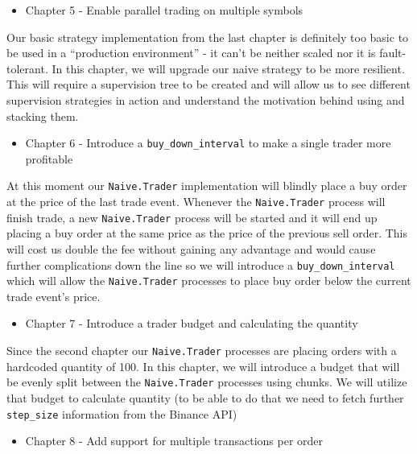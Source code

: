 \documentclass[
]{book}
\providecommand{\tightlist}{%
  \setlength{\itemsep}{0pt}\setlength{\parskip}{0pt}}
\begin{document}
\begin{itemize}
\tightlist
\item
  Chapter 5 - Enable parallel trading on multiple symbols
\end{itemize}

Our basic strategy implementation from the last chapter is definitely too basic to be used in a ``production environment'' - it can't be neither scaled nor it is fault-tolerant. In this chapter, we will upgrade our naive strategy to be more resilient. This will require a supervision tree to be created and will allow us to see different supervision strategies in action and understand the motivation behind using and stacking them.

\begin{itemize}
\tightlist
\item
  Chapter 6 - Introduce a \texttt{buy\_down\_interval} to make a single trader more profitable
\end{itemize}

At this moment our \texttt{Naive.Trader} implementation will blindly place a buy order at the price of the last trade event. Whenever the \texttt{Naive.Trader} process will finish trade, a new \texttt{Naive.Trader} process will be started and it will end up placing a buy order at the same price as the price of the previous sell order. This will cost us double the fee without gaining any advantage and would cause further complications down the line so we will introduce a \texttt{buy\_down\_interval} which will allow the \texttt{Naive.Trader} processes to place buy order below the current trade event's price.

\begin{itemize}
\tightlist
\item
  Chapter 7 - Introduce a trader budget and calculating the quantity
\end{itemize}

Since the second chapter our \texttt{Naive.Trader} processes are placing orders with a hardcoded quantity of 100. In this chapter, we will introduce a budget that will be evenly split between the \texttt{Naive.Trader} processes using chunks. We will utilize that budget to calculate quantity (to be able to do that we need to fetch further \texttt{step\_size} information from the Binance API)

\begin{itemize}
\tightlist
\item
  Chapter 8 - Add support for multiple transactions per order
\end{itemize}
\end{document}
